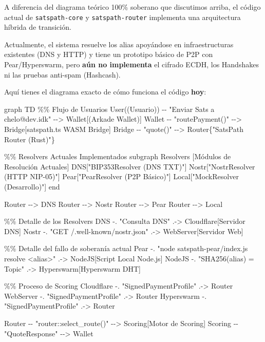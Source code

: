 \documentclass[
]{article}
\newenvironment{Shaded}{}{}
\newcommand{\NormalTok}[1]{#1}
\begin{document}
A diferencia del diagrama teórico 100\% soberano que discutimos arriba,
el código actual de \texttt{satspath-core} y \texttt{satspath-router}
implementa una arquitectura híbrida de transición.

Actualmente, el sistema resuelve los alias apoyándose en
infraestructuras existentes (DNS y HTTP) y tiene un prototipo básico de
P2P con Pear/Hyperswarm, pero \textbf{aún no implementa} el cifrado
ECDH, los Handshakes ni las pruebas anti-spam (Hashcash).

Aquí tienes el diagrama exacto de cómo funciona el código \textbf{hoy}:

\begin{Shaded}
\begin{Highlighting}[]
\NormalTok{graph TD}
\NormalTok{    \%\% Flujo de Usuarios}
\NormalTok{    User((Usuario)) {-}{-} "Enviar Sats a chelo@dev.idk" {-}{-}\textgreater{} Wallet[(Arkade Wallet)]}
\NormalTok{    Wallet {-}{-} "routePayment()" {-}{-}\textgreater{} Bridge[satspath.ts WASM Bridge]}
\NormalTok{    Bridge {-}{-} "quote()" {-}{-}\textgreater{} Router\{"SatsPath Router (Rust)"\}}

\NormalTok{    \%\% Resolvers Actuales Implementados}
\NormalTok{    subgraph Resolvers [Módulos de Resolución Actuales]}
\NormalTok{        DNS["BIP353Resolver (DNS TXT)"]}
\NormalTok{        Nostr["NostrResolver (HTTP NIP{-}05)"]}
\NormalTok{        Pear["PearResolver (P2P Básico)"]}
\NormalTok{        Local["MockResolver (Desarrollo)"]}
\NormalTok{    end}

\NormalTok{    Router {-}{-}\textgreater{} DNS}
\NormalTok{    Router {-}{-}\textgreater{} Nostr}
\NormalTok{    Router {-}{-}\textgreater{} Pear}
\NormalTok{    Router {-}{-}\textgreater{} Local}

\NormalTok{    \%\% Detalle de los Resolvers}
\NormalTok{    DNS {-}. "Consulta DNS" .{-}\textgreater{} Cloudflare[Servidor DNS]}
\NormalTok{    Nostr {-}. "GET /.well{-}known/nostr.json" .{-}\textgreater{} WebServer[Servidor Web]}
    
\NormalTok{    \%\% Detalle del fallo de soberanía actual}
\NormalTok{    Pear {-}. "node satspath{-}pear/index.js resolve \textless{}alias\textgreater{}" .{-}\textgreater{} NodeJS[Script Local Node.js]}
\NormalTok{    NodeJS {-}. "SHA256(alias) = Topic" .{-}\textgreater{} Hyperswarm[Hyperswarm DHT]}
    
\NormalTok{    \%\% Proceso de Scoring}
\NormalTok{    Cloudflare {-}. "SignedPaymentProfile" .{-}\textgreater{} Router}
\NormalTok{    WebServer {-}. "SignedPaymentProfile" .{-}\textgreater{} Router}
\NormalTok{    Hyperswarm {-}. "SignedPaymentProfile" .{-}\textgreater{} Router}
    
\NormalTok{    Router {-}{-} "router::select\_route()" {-}{-}\textgreater{} Scoring[Motor de Scoring]}
\NormalTok{    Scoring {-}{-} "QuoteResponse" {-}{-}\textgreater{} Wallet}
\end{Highlighting}
\end{Shaded}
\end{document}
